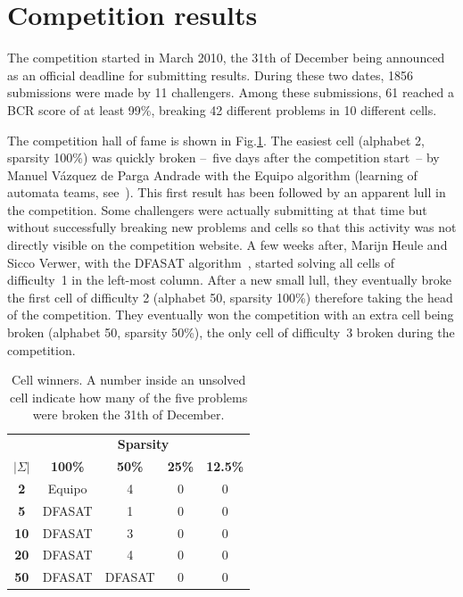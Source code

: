 
\section{Competition results\label{section:stamina-results}}

The competition started in March 2010, the 31th of December being announced as an official deadline for submitting results. During these two dates, 1856 submissions were made by 11 challengers. Among these submissions, 61 reached a BCR score of at least 99\%, breaking 42 different problems in 10 different cells.

The competition hall of fame is shown in Fig.\ref{stamina:table:hall-of-fame}. The easiest cell (alphabet 2, sparsity 100\%) was quickly broken --~five days after the competition start~-- by Manuel V\'azquez de Parga Andrade with the Equipo algorithm (learning of automata teams, see~\cite{Garcia:2010}). This first result has been followed by an apparent lull in the competition. Some challengers were actually submitting at that time but without successfully breaking new problems and cells so that this activity was not directly visible on the competition website. A few weeks after, Marijn Heule and Sicco Verwer, with the DFASAT algorithm~\cite{Heule10}, started solving all cells of difficulty~1 in the left-most column. After a new small lull, they eventually broke the first cell of difficulty 2 (alphabet 50, sparsity 100\%) therefore taking the head of the competition. They eventually won the competition with an extra cell being broken (alphabet 50, sparsity 50\%), the only cell of difficulty~3 broken during the competition.

\begin{table}[H]
\begin{center}
\begin{tabular}{c|c c c c}
&\multicolumn{4}{|c}{\textbf{Sparsity}}\\ 
\textbf{$|\Sigma|$} & \textbf{100\%} & \textbf{50\%} & \textbf{25\%} & \textbf{12.5\%}\\
\hline
\textbf{2}  & Equipo & 4 & 0 & 0 \\
\textbf{5}  & DFASAT & 1 & 0 & 0 \\
\textbf{10} & DFASAT & 3 & 0 & 0 \\
\textbf{20} & DFASAT & 4 & 0 & 0 \\
\textbf{50} & DFASAT & DFASAT & 0 & 0 \\
\end{tabular}
\end{center}
\caption{Cell winners. A number inside an unsolved cell indicate how many of the five problems were broken the 31th of December.\label{stamina:table:hall-of-fame}}
\end{table}

